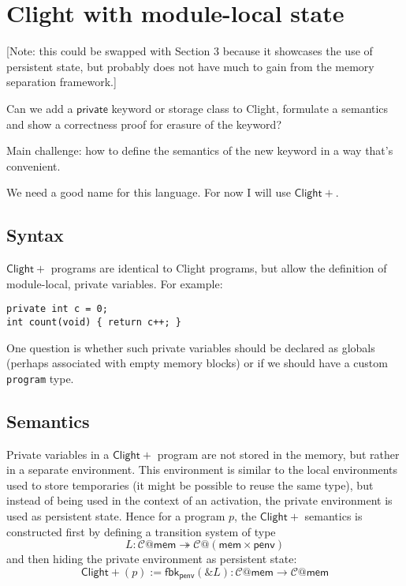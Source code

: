 \documentclass[acmsmall,screen,review,anonymous]{acmart}
\newcommand{\ClightP}{\ensuremath{\mathsf{Clight+}}}
\begin{document}

\section{Clight with module-local state} %

[Note: this could be swapped with Section 3
because it showcases the use of persistent state,
but probably does not have much to gain
from the memory separation framework.]

Can we add a $\mathsf{private}$ keyword or storage class to Clight,
formulate a semantics and show a correctness proof
for erasure of the keyword?

Main challenge: how to define the semantics of the new keyword
in a way that's convenient.

We need a good name for this language.
For now I will use \ClightP{}.

\subsection{Syntax}

\ClightP{} programs are identical to Clight programs,
but allow the definition of module-local, private variables.
For example:

\begin{verbatim}
private int c = 0;
int count(void) { return c++; }
\end{verbatim}

One question is whether such private variables
should be declared as globals
(perhaps associated with empty memory blocks)
or if we should have a custom \texttt{program} type.

\subsection{Semantics}

Private variables in a \ClightP{} program
are not stored in the memory,
but rather in a separate environment.
This environment is similar to
the local environments used to store temporaries
(it might be possible to reuse the same type),
but instead of being used in the context of an activation,
the private environment is used as persistent state.
Hence for a program $p$, the \ClightP{} semantics is constructed
first by defining a transition system of type
\[
  L : \mathcal{C}@\mathsf{mem} \twoheadrightarrow
      \mathcal{C}@(\mathsf{mem}\times\mathsf{penv})
\]
and then hiding the private environment as persistent state:
\[
  \ClightP{}(p) := \mathsf{fbk}_\mathsf{penv}(\&L) :
    \mathcal{C}@\mathsf{mem} \rightarrow
    \mathcal{C}@\mathsf{mem}
\]
\end{document}
